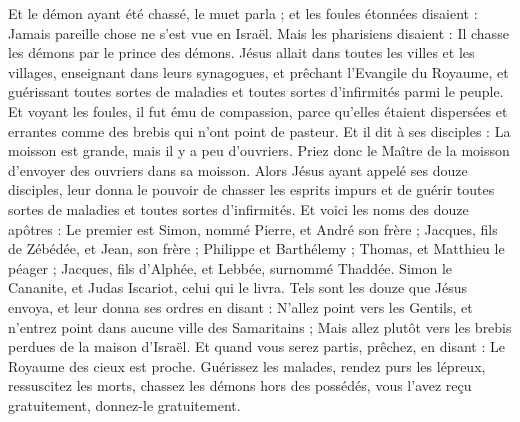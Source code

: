 \begin{multicols}{2}
Et le démon ayant été chassé, le muet parla ; et les foules étonnées disaient : Jamais pareille chose ne s'est vue en Israël.
Mais les pharisiens disaient : Il chasse les démons par le prince des démons.
Jésus allait dans toutes les villes et les villages, enseignant dans leurs synagogues, et prêchant l'Evangile du Royaume, et guérissant toutes sortes de maladies et toutes sortes d'infirmités parmi le peuple.
Et voyant les foules, il fut ému de compassion, parce qu'elles étaient dispersées et errantes comme des brebis qui n'ont point de pasteur.
Et il dit à ses disciples : La moisson est grande, mais il y a peu d'ouvriers.
Priez donc le Maître de la moisson d'envoyer des ouvriers dans sa moisson.
\VerseOne{}Alors Jésus ayant appelé ses douze disciples, leur donna le pouvoir de chasser les esprits impurs et de guérir toutes sortes de maladies et toutes sortes d'infirmités.
Et voici les noms des douze apôtres : Le premier est Simon, nommé Pierre, et André son frère ; Jacques, fils de Zébédée, et Jean, son frère ;
Philippe et Barthélemy ; Thomas, et Matthieu le péager ; Jacques, fils d'Alphée, et Lebbée, surnommé Thaddée.
Simon le Cananite, et Judas Iscariot, celui qui le livra.
Tels sont les douze que Jésus envoya, et leur donna ses ordres en disant : N'allez point vers les Gentils, et n'entrez point dans aucune ville des Samaritains ;
Mais allez plutôt vers les brebis perdues de la maison d'Israël.
Et quand vous serez partis, prêchez, en disant : Le Royaume des cieux est proche.
Guérissez les malades, rendez purs les lépreux, ressuscitez les morts, chassez les démons hors des possédés, vous l'avez reçu gratuitement, donnez-le gratuitement.

\end{multicols}
